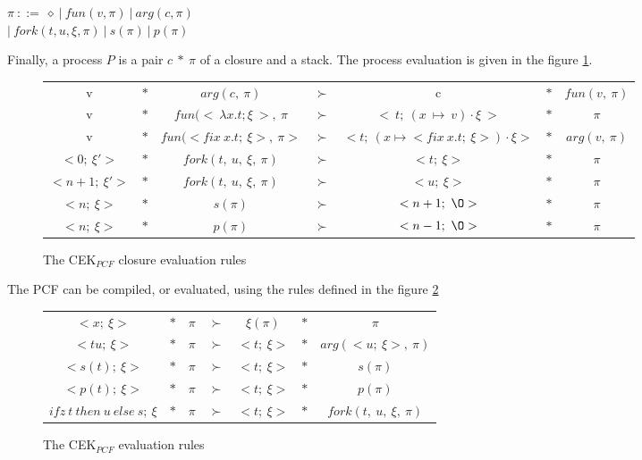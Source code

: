 \documentclass[a4paper,12pt]{article}
\begin{document}
\begin{center}
  $\pi~::=~\diamond~|~fun(v, \pi)~|~arg(c, \pi)$ \\
  $|~fork(t,u,\xi,\pi)~|~s(\pi)~|~p(\pi)$
\end{center}

Finally, a process $P$ is a pair $c~*~\pi$ of a closure and a stack. The process
evaluation is given in the figure \ref{cek-eval-closure}.

\begin{figure}[!ht]
  \begin{center}
    \begin{tabular}{|c c c c c c c|}
      \hline
      v & $*$ & $arg(c,~\pi)$ & $\succ$ & c & $*$ & $fun(v,~\pi)$ \\
      v & $*$ & $fun(<~\lambda x.t;\xi~>,~\pi$ & $\succ$ &
      $<~t;~(x~\mapsto~v)\cdot \xi~>$ 
      & $*$ & $\pi$ \\
      v & $*$ & $fun(<fix~x.t;~\xi>,~\pi>$ & $\succ$ &
      $<t;~(x\mapsto <fix~x.t;~\xi>) \cdot \xi>$ & $*$ & $arg(v,~\pi)$ \\
      $<0;~\xi'>$ & $*$ & $fork(t,~u,~\xi,~\pi)$ & $\succ$ &
      $<t;~\xi>$ & $*$ & $\pi$ \\
      $<n+1;~\xi'>$ & $*$ & $fork(t,~u,~\xi,~\pi)$ & $\succ$ &
      $<u;~\xi>$ & $*$ & $\pi$ \\
      $<n;~\xi>$ & $*$ & $s(\pi)$ & $\succ$ &
      $<n+1;~\O>$ & $*$ & $\pi$ \\
      $<n;~\xi>$ & $*$ & $p(\pi)$ & $\succ$ &
      $<n-1;~\O>$ & $*$ & $\pi$ \\
      \hline
    \end{tabular}
  \end{center}
  \caption{The CEK$_{PCF}$ closure evaluation rules}
  \label{cek-eval-closure}
\end{figure}


The PCF can be compiled, or evaluated, using the rules defined in the figure \ref{cek-eval-rules}

\begin{figure}[!ht]
  \begin{center}
    \begin{tabular}{|c c c c c c c|}
      \hline
      $<x;~\xi>$ & $*$ & $\pi$ & $\succ$ & $\xi(\pi)$ & $*$ & $\pi$ \\
      $<tu;~\xi>$ & $*$ & $\pi$ & $\succ$ & $<t;~\xi>$ & $*$ & 
      $arg(<u;~\xi>,~\pi)$ \\
      $<s(t);~\xi>$ & $*$ & $\pi$ & $\succ$ & $<t;~\xi>$ & $*$ & 
      $s(\pi)$ \\
      $<p(t);~\xi>$ & $*$ & $\pi$ & $\succ$ & $<t;~\xi>$ & $*$ & 
      $p(\pi)$ \\
      $ifz~t~then~u~else~s;~\xi$ 
      & $*$ & $\pi$ & $\succ$ & $<t;~\xi>$ & $*$ & 
      $fork(t,~u,~\xi,~\pi)$ \\
      \hline
    \end{tabular}
  \end{center}
  \caption{The CEK$_{PCF}$ evaluation rules}
  \label{cek-eval-rules}
\end{figure}
\end{document}
